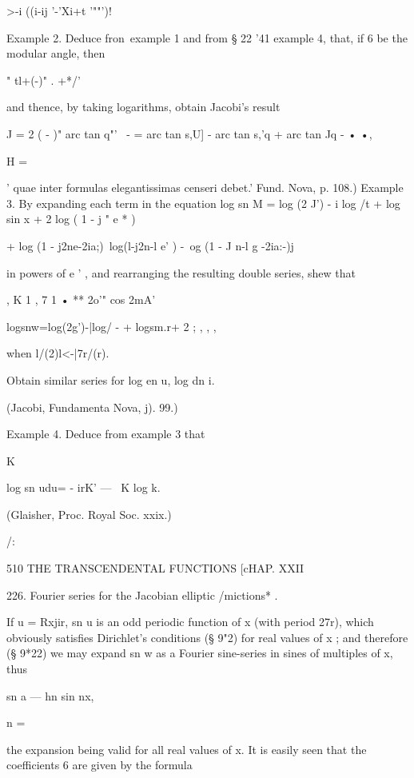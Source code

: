   >-i ((i-ij '-'Xi+t '""')! 






Example 2. Deduce fron\ example 1 and from § 22 '41 example 4, that, if 6 be the 
modular angle, then 

" tl+(-)" .  +*/' 

and thence, by taking logarithms, obtain Jacobi's result 

J   = 2 ( - )" arc tan q"'~  - = arc tan s,U] - arc tan s,'q  + arc tan Jq  - • •, 

H = 

' quae inter formulas elegantissimas censeri debet.'  Fund. Nova, p. 108.) 
Example 3. By expanding each term in the equation 
log sn M = log (2 J') - i log /t + log sin x + 2  log ( 1 - j " e * ) 

+ log (1 - j2ne-2ia;)\ log(l-j2n-l e'  ) -\ og (1 - J n-l g -2ia:-)j 

in powers of e '  , and rearranging the resulting double series, shew that 

, K 1 , 7 1 • ** 2o'" cos 2mA' 

logsnw=log(2g')-|log/ - + logsm.r+ 2 ; , , , 

when l/(2)l<-|7r/(r). 

Obtain similar series for log en u, log dn  i. 

(Jacobi, Fundamenta Nova, j). 99.) 

Example 4. Deduce from example 3 that 

 K 

log sn udu= -  irK' — \ K log k. 

(Glaisher, Proc. Royal Soc. xxix.) 



/: 



510 THE TRANSCENDENTAL FUNCTIONS [cHAP. XXII 

226. Fourier series for the Jacobian elliptic /mictions* . 

If u =  Rxjir, sn u is an odd periodic function of x (with period 27r), which 
obviously satisfies Dirichlet's conditions (§ 9"2) for real values of x ; and 
therefore (§ 9*22) we may expand sn w as a Fourier sine-series in sines of 
multiples of x, thus 

sn a —   hn sin nx, 

n = \ 

the expansion being valid for all real values of x. It is easily seen that the 
coefficients 6  are given by the formula 



